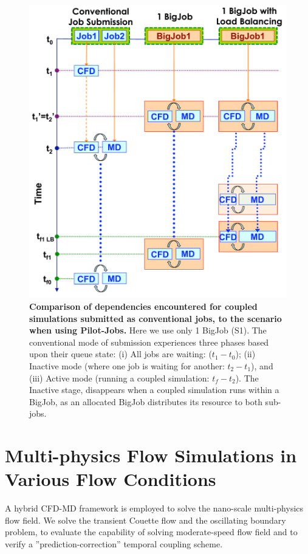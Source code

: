 \documentclass[preprint,12pt]{elsarticle}
\begin{document}
\begin{figure}
\centering
\includegraphics[width=0.8\linewidth]{Single_BigJob_Scenarios_new.pdf}
\caption{\small {\bf Comparison of dependencies encountered for coupled
  simulations submitted as conventional jobs, to the scenario when
  using Pilot-Jobs.} Here we use only 1 BigJob (S1). The conventional
  mode of submission experiences three phases based upon their queue
  state: (i) All jobs are waiting: ($t_1-t_0$); (ii) Inactive mode
  (where one job is waiting for another: $t_2-t_1$), and (iii) Active
  mode (running a coupled simulation: $t_f-t_2$). The Inactive stage,
  disappears when a coupled simulation runs within a BigJob, as an
  allocated BigJob distributes its resource to both sub-jobs.}
\label{Fig:OneBJ_Flow}
\vspace{-1em}
\end{figure}



\section{Multi-physics Flow Simulations in Various Flow Conditions}
\label{sec:accuracy}
A hybrid CFD-MD framework is employed to solve the nano-scale multi-physics flow field. We solve the transient Couette flow and the oscillating boundary problem, to evaluate the capability of solving moderate-speed flow field and to verify a ''prediction-correction'' temporal coupling scheme.
\end{document}

